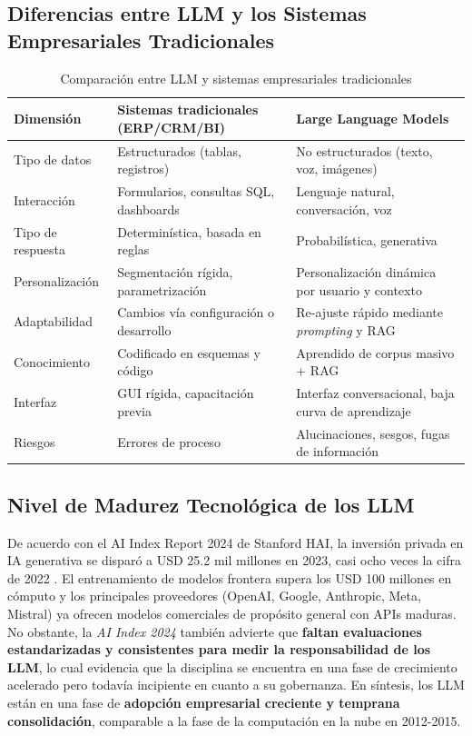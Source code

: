 \documentclass[12pt,a4paper,oneside]{article}
\begin{document}
\subsection{Diferencias entre LLM y los Sistemas Empresariales Tradicionales}

\begin{table}[h!]
\centering
\caption{Comparación entre LLM y sistemas empresariales tradicionales}
\label{tab:comparacion}
\begin{tabular}{p{4.5cm} p{5.5cm} p{5.5cm}}
\toprule
\textbf{Dimensión} & \textbf{Sistemas tradicionales (ERP/CRM/BI)} & \textbf{Large Language Models} \\
\midrule
Tipo de datos & Estructurados (tablas, registros) & No estructurados (texto, voz, imágenes) \\
Interacción & Formularios, consultas SQL, dashboards & Lenguaje natural, conversación, voz \\
Tipo de respuesta & Determinística, basada en reglas & Probabilística, generativa \\
Personalización & Segmentación rígida, parametrización & Personalización dinámica por usuario y contexto \\
Adaptabilidad & Cambios vía configuración o desarrollo & Re-ajuste rápido mediante \textit{prompting} y RAG \\
Conocimiento & Codificado en esquemas y código & Aprendido de corpus masivo + RAG \\
Interfaz & GUI rígida, capacitación previa & Interfaz conversacional, baja curva de aprendizaje \\
Riesgos & Errores de proceso & Alucinaciones, sesgos, fugas de información \\
\bottomrule
\end{tabular}
\end{table}

\subsection{Nivel de Madurez Tecnológica de los LLM}

De acuerdo con el AI Index Report 2024 de Stanford HAI, la inversión privada en IA generativa se disparó a USD 25.2 mil millones en 2023, casi ocho veces la cifra de 2022 \cite{stanfordAIIndex2024}. El entrenamiento de modelos frontera supera los USD 100 millones en cómputo y los principales proveedores (OpenAI, Google, Anthropic, Meta, Mistral) ya ofrecen modelos comerciales de propósito general con APIs maduras. No obstante, la \textit{AI Index 2024} también advierte que \textbf{faltan evaluaciones estandarizadas y consistentes para medir la responsabilidad de los LLM}, lo cual evidencia que la disciplina se encuentra en una fase de crecimiento acelerado pero todavía incipiente en cuanto a su gobernanza. En síntesis, los LLM están en una fase de \textbf{adopción empresarial creciente y temprana consolidación}, comparable a la fase de la computación en la nube en 2012-2015.
\end{document}
